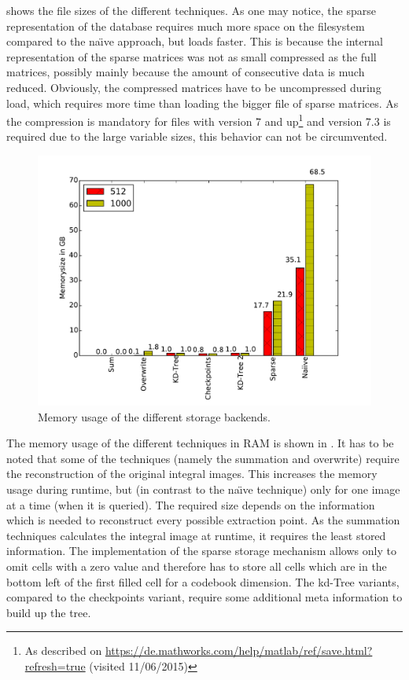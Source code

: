  shows the file sizes of the different techniques. As one may notice, the \MATLAB sparse representation of the database requires much more space on the filesystem compared to the na\"{\i}ve approach, but loads faster. This is because the internal representation of the sparse matrices was not as small compressed as the full matrices, possibly mainly because the amount of consecutive data is much reduced. Obviously, the compressed matrices have to be uncompressed during load, which requires more time than loading the bigger file of sparse matrices. As the compression is mandatory for \MATLAB files with version 7 and up\footnote{\label{footnote:matlab_files}As described on \url{https://de.mathworks.com/help/matlab/ref/save.html?refresh=true} (visited 11/06/2015)} and version 7.3 is required due to the large variable sizes, this behavior can not be circumvented.


\begin{figure}
\centering
\includegraphics[width=0.7\linewidth]{images/mem_size}
\caption{Memory usage of the different storage backends.}
\label{fig:memory_usage}
\end{figure}

The memory usage of the different techniques in \ac{RAM} is shown in . It has to be noted that some of the techniques (namely the summation and overwrite) require the reconstruction of the original integral images. This increases the memory usage during runtime, but (in contrast to the na\"{\i}ve technique) only for one image at a time (when it is queried). The required size depends on the information which is needed to reconstruct every possible extraction point. As the summation techniques calculates the integral image at runtime, it requires the least stored information. The implementation of the sparse storage mechanism allows only to omit cells with a zero value and therefore has to store all cells which are in the bottom left of the first filled cell for a codebook dimension. The kd-Tree variants, compared to the checkpoints variant, require some additional meta information to build up the tree.

